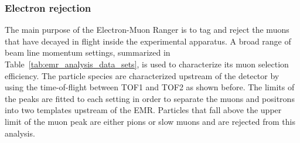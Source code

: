 \subsubsection{Electron rejection}
The main purpose of the Electron-Muon Ranger is to tag and reject the muons that have decayed in flight inside the experimental apparatus. A broad range of beam line momentum settings, summarized in Table~\ref{tab:emr_analysis_data_sets}, is used to characterize its muon selection efficiency. The particle species are characterized upstream of the detector by using the time-of-flight between TOF1 and TOF2 as shown before.
The limits of the peaks are fitted to each setting in order to separate the muons and positrons into two templates upstream of the EMR. Particles that fall above the upper limit of the muon peak are either pions or slow muons and are rejected from this analysis.

